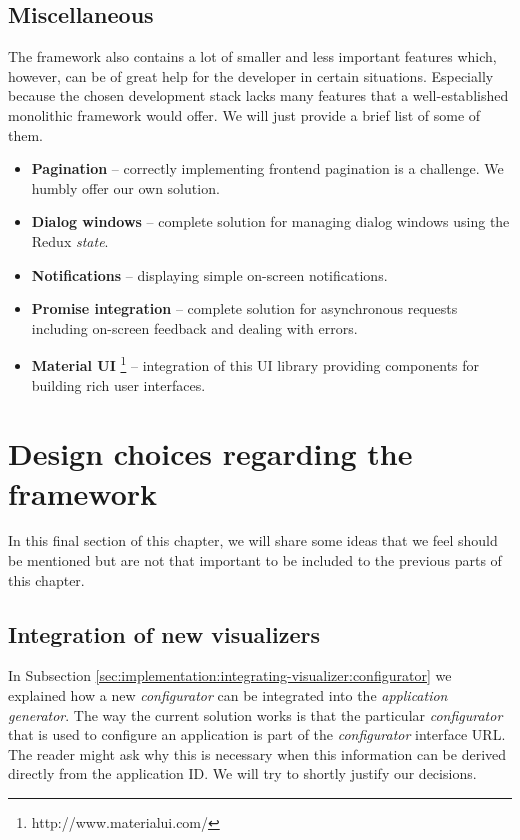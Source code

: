 \subsection{Miscellaneous}

The framework also contains a lot of smaller and less important features which, however, can be of great help for the developer in certain situations. Especially because  the chosen development stack lacks many features that a well-established monolithic framework would offer.  We will just provide a brief list of some of them. 

\begin{itemize}
\item \textbf{Pagination} -- correctly implementing frontend pagination is a challenge. We humbly offer our own solution.
\item \textbf{Dialog windows} -- complete solution for managing dialog windows using the Redux \emph{state}.
\item \textbf{Notifications} -- displaying simple on-screen notifications.
\item \textbf{Promise integration} -- complete solution for asynchronous requests including on-screen feedback and dealing with errors.
\item \textbf{Material UI} \footnote{http://www.material\-ui.com/} -- integration of this UI library providing components for building rich user interfaces.

\end{itemize}
\section{Design choices regarding the framework}

In this final section of this chapter, we will share some ideas that we feel should be mentioned but are not that important to be included to the previous parts of this chapter.

\subsection{Integration of new visualizers}
\label{sec:implementation:design-choices:integration}

In Subsection \ref{sec:implementation:integrating-visualizer:configurator} we explained how a new \emph{configurator} can be integrated into the \emph{application generator}. The way the current solution works is that the particular \emph{configurator} that is used to configure an application is part of the \emph{configurator} interface URL. The reader might ask why this is necessary when this information can be derived directly from the application ID. We will try to shortly justify our decisions.

